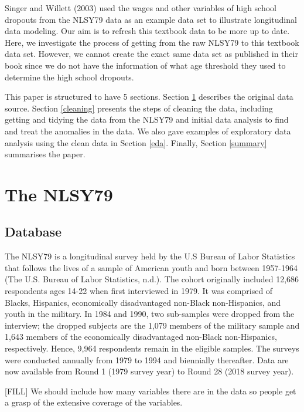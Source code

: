 \documentclass[12pt]{article}
\begin{document}
Singer and Willett (2003) used the wages and other variables of high school dropouts from the NLSY79 data as an example data set to illustrate longitudinal data modeling. Our aim is to refresh this textbook data to be more up to date. Here, we investigate the process of getting from the raw NLSY79 to this textbook data set. However, we cannot create the exact same data set as published in their book since we do not have the information of what age threshold they used to determine the high school dropouts.

This paper is structured to have 5 sections. Section \ref{database} describes the original data source. Section \ref{cleaning} presents the steps of cleaning the data, including getting and tidying the data from the NLSY79 and initial data analysis to find and treat the anomalies in the data. We also gave examples of exploratory data analysis using the clean data in Section \ref{eda}. Finally, Section \ref{summary} summarises the paper.

\hypertarget{database}{%
\section{The NLSY79}\label{database}}

\hypertarget{database-1}{%
\subsection{Database}\label{database-1}}

The NLSY79 is a longitudinal survey held by the U.S Bureau of Labor Statistics that follows the lives of a sample of American youth and born between 1957-1964 (The U.S. Bureau of Labor Statistics, n.d.). The cohort originally included 12,686 respondents ages 14-22 when first interviewed in 1979. It was comprised of Blacks, Hispanics, economically disadvantaged non-Black non-Hispanics, and youth in the military. In 1984 and 1990, two sub-samples were dropped from the interview; the dropped subjects are the 1,079 members of the military sample and 1,643 members of the economically disadvantaged non-Black non-Hispanics, respectively. Hence, 9,964 respondents remain in the eligible samples. The surveys were conducted annually from 1979 to 1994 and biennially thereafter. Data are now available from Round 1 (1979 survey year) to Round 28 (2018 survey year).

{[}FILL{]} We should include how many variables there are in the data so people get a grasp of the extensive coverage of the variables.
\end{document}
